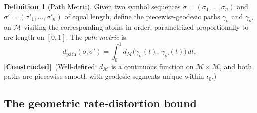 \documentclass[11pt,a4paper]{article}
\theoremstyle{definition}
\newtheorem{definition}[theorem]{Definition}
\theoremstyle{remark}
\newcommand{\statusconstructed}{\textcolor{blue!70!black}{\textbf{[Constructed]}}}
\begin{document}

\begin{definition}[Path Metric]\label{def:path_metric}
Given two symbol sequences $\sigma = (\sigma_1, \ldots, \sigma_n)$ 
and $\sigma' = (\sigma'_1, \ldots, \sigma'_n)$ of equal length, 
define the piecewise-geodesic paths $\gamma_\sigma$ and 
$\gamma_{\sigma'}$ on $\mathcal{M}$ visiting the corresponding 
atoms in order, parametrized proportionally to arc length on 
$[0,1]$. The \emph{path metric} is:
\begin{equation}\label{eq:path_metric}
    d_{\mathrm{path}}(\sigma, \sigma') = 
    \int_0^1 d_{\mathcal{M}}\!\bigl(
    \gamma_\sigma(t),\, \gamma_{\sigma'}(t)\bigr)\, dt.
\end{equation}
\statusconstructed\ (Well-defined: $d_{\mathcal{M}}$ is a 
continuous function on $\mathcal{M} \times \mathcal{M}$, and 
both paths are piecewise-smooth with geodesic segments unique 
within $\iota_0$.)
\end{definition}

\subsection{The geometric rate-distortion bound}%
\label{sec:rate_distortion}

\end{document}
